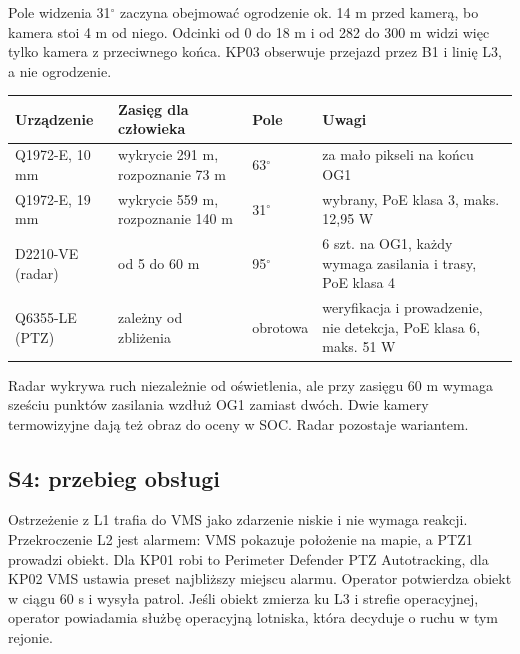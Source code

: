 
Pole widzenia 31$^\circ$ zaczyna obejmować ogrodzenie ok. 14 m przed kamerą, bo kamera stoi 4 m od niego. Odcinki od 0 do 18 m i od 282 do 300 m widzi więc tylko kamera z przeciwnego końca. KP03 obserwuje przejazd przez B1 i linię L3, a nie ogrodzenie.

\noindent\begin{minipage}{\linewidth}
\end{minipage}

\begin{center}
\small
\begin{tabularx}{\linewidth}{@{}lllY@{}}
\toprule
Urządzenie & Zasięg dla człowieka & Pole & Uwagi \\
\midrule
Q1972-E, 10 mm & wykrycie 291 m, rozpoznanie 73 m & 63$^\circ$ & za mało pikseli na końcu OG1 \\
Q1972-E, 19 mm & wykrycie 559 m, rozpoznanie 140 m & 31$^\circ$ & wybrany, PoE klasa 3, maks. 12,95 W \\
D2210-VE (radar) & od 5 do 60 m & 95$^\circ$ & 6 szt. na OG1, każdy wymaga zasilania i trasy, PoE klasa 4 \\
Q6355-LE (PTZ) & zależny od zbliżenia & obrotowa & weryfikacja i prowadzenie, nie detekcja, PoE klasa 6, maks. 51 W \\
\bottomrule
\end{tabularx}
\end{center}
Radar wykrywa ruch niezależnie od oświetlenia, ale przy zasięgu 60 m wymaga sześciu punktów zasilania wzdłuż OG1 zamiast dwóch. Dwie kamery termowizyjne dają też obraz do oceny w SOC. Radar pozostaje wariantem.\cite{S-D2210,S-Q6355}

\subsection*{S4: przebieg obsługi}
Ostrzeżenie z L1 trafia do VMS jako zdarzenie niskie i nie wymaga reakcji. Przekroczenie L2 jest alarmem: VMS pokazuje położenie na mapie, a PTZ1 prowadzi obiekt. Dla KP01 robi to Perimeter Defender PTZ Autotracking, dla KP02 VMS ustawia preset najbliższy miejscu alarmu. Operator potwierdza obiekt w ciągu 60 s i wysyła patrol. Jeśli obiekt zmierza ku L3 i strefie operacyjnej, operator powiadamia służbę operacyjną lotniska, która decyduje o ruchu w tym rejonie.\cite{S-PD,S-PDPTZ}

